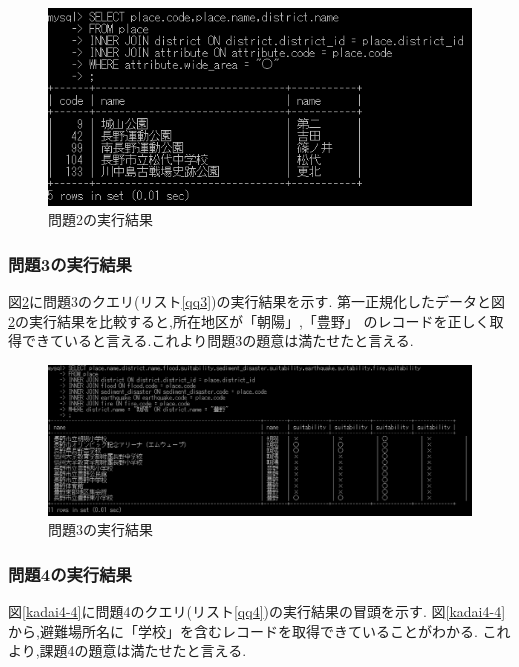 \documentclass[a4j]{jarticle}
\begin{document}
    \begin{figure}[H]
      \centering
      \includegraphics[scale=1.0]{kadai4-2.png}
      \caption{問題2の実行結果}
       \label{kadai4-2}
      \end{figure}

    \subsubsection{問題3の実行結果}
    図\ref{kadai4-3}に問題3のクエリ(リスト\ref{qq3})の実行結果を示す.
    第一正規化したデータと図\ref{kadai4-3}の実行結果を比較すると,所在地区が「朝陽」,「豊野」
    のレコードを正しく取得できていると言える.これより問題3の題意は満たせたと言える.

    \begin{figure}[H]
      \centering
      \includegraphics[scale=0.7]{kadai4-3.png}
      \caption{問題3の実行結果}
       \label{kadai4-3}
      \end{figure}

    \subsubsection{問題4の実行結果}
    図\ref{kadai4-4}に問題4のクエリ(リスト\ref{qq4})の実行結果の冒頭を示す.
    図\ref{kadai4-4}から,避難場所名に「学校」を含むレコードを取得できていることがわかる.
    これより,課題4の題意は満たせたと言える.
\end{document}
